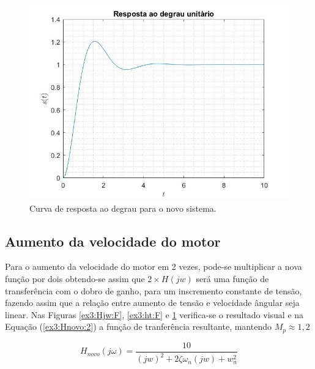 \documentclass[a4paper,12pt,oneside,openany,table,xcdraw]{article}
\begin{document}
\vspace{0.2cm}
\begin{figure}[H]
\centering
\includegraphics[width=14cm]{ex3-stf}
\caption{Curva de resposta ao degrau para o novo sistema.}
\label{ex3:st:F}
\end{figure}


\vspace{0.3cm}
\subsection{Aumento da velocidade do motor}
Para o aumento da velocidade do motor em 2 vezes, pode-se multiplicar a nova função por dois obtendo-se assim que $2\times H(jw)$ será uma função de transferência com o dobro de ganho, para um inscremento constante de tensão, fazendo assim que a relação entre aumento de tensão e velocidade ângular seja linear. Nas Figuras \ref{ex3:Hjw:F}, \ref{ex3:ht:F} e \ref{ex3:st:F} verifica-se o resultado visual e na Equação (\ref{ex3:Hnovo:2}) a função de tranferência resultante, mantendo $M_p \approx 1,2$

\vspace{0.2cm}
\begin{equation} \label{ex3:Hnovo:2}
H_{novo}(j\omega) = \dfrac{10}{(jw)^2 + 2 \zeta \omega_n (jw) + w_n ^2}
\end{equation}
\end{document}
